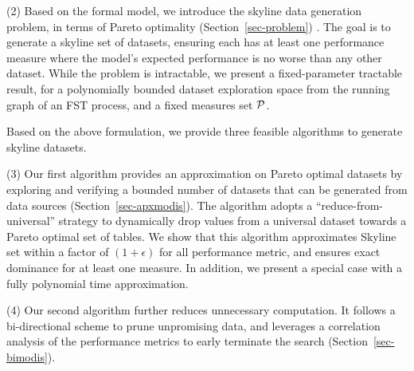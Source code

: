 \sstab
(2) Based on the 
formal model, %
we
introduce the skyline data generation 
problem, 
in terms of Pareto optimality 
(Section~\ref{sec-problem}) . 
The goal is to generate  
a skyline set of 
datasets, ensuring each has at least one 
performance measure where the model's expected performance is no worse than any other dataset.
While the problem is intractable, 
we present a fixed-parameter 
tractable result, for a polynomially bounded dataset exploration space from the running graph of an FST process, 
and a fixed measures set $\P$. 

\vspace{.5ex}
Based on the above formulation, we provide 
three feasible algorithms to generate 
skyline datasets. 

\sstab 
(3) Our first algorithm provides an approximation 
on Pareto optimal datasets by 
exploring and verifying a bounded number of 
datasets that can be generated from 
data sources %
(Section~\ref{sec-apxmodis}). 
The algorithm adopts a 
``reduce-from-universal'' strategy 
to dynamically drop  
values from a universal dataset towards 
a Pareto optimal set of tables. 
We show that this algorithm 
approximates Skyline set within 
a factor of $(1+\epsilon)$ 
for all performance metric, 
and ensures exact dominance 
for at least one measure.
In addition, we present a 
special case with a 
fully polynomial time 
approximation. 

\sstab 
(4) Our second 
algorithm further 
reduces unnecessary 
computation. It follows a bi-directional scheme to 
prune unpromising
data, and leverages   
a correlation analysis 
of the performance metrics 
to early terminate the 
search 
(Section~\ref{sec-bimodis}). 

